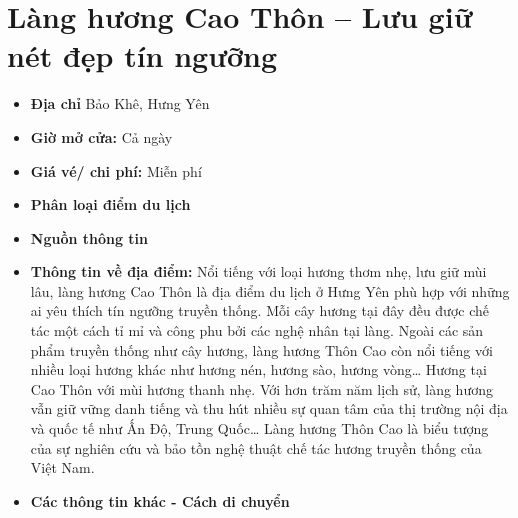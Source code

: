 \documentclass{article}
\begin{document}
\section{Làng hương Cao Thôn – Lưu giữ nét đẹp tín ngưỡng}
\begin{itemize}
    \item{\textbf{Địa chỉ}} Bảo Khê, Hưng Yên

    \item{\textbf{Giờ mở cửa:}} Cả ngày

    \item{\textbf{Giá vé/ chi phí:}} Miễn phí

    \item{\textbf{Phân loại điểm du lịch}}

    \item{\textbf{Nguồn thông tin}}

    \item{\textbf{Thông tin về địa điểm:}} Nổi tiếng với loại hương thơm nhẹ, lưu giữ mùi lâu, làng hương Cao Thôn là địa điểm du lịch ở Hưng Yên phù hợp với những ai yêu thích tín ngưỡng truyền thống. Mỗi cây hương tại đây đều được chế tác một cách tỉ mỉ và công phu bởi các nghệ nhân tại làng. Ngoài các sản phẩm truyền thống như cây hương, làng hương Thôn Cao còn nổi tiếng với nhiều loại hương khác như hương nén, hương sào, hương vòng… Hương tại Cao Thôn với mùi hương thanh nhẹ. Với hơn trăm năm lịch sử, làng hương vẫn giữ vững danh tiếng và thu hút nhiều sự quan tâm của thị trường nội địa và quốc tế như Ấn Độ, Trung Quốc… Làng hương Thôn Cao là biểu tượng của sự nghiên cứu và bảo tồn nghệ thuật chế tác hương truyền thống của Việt Nam.
\end{itemize}

\begin{itemize}
    \item{\textbf{Các thông tin khác - Cách di chuyển}}
\end{itemize}
\end{document}
